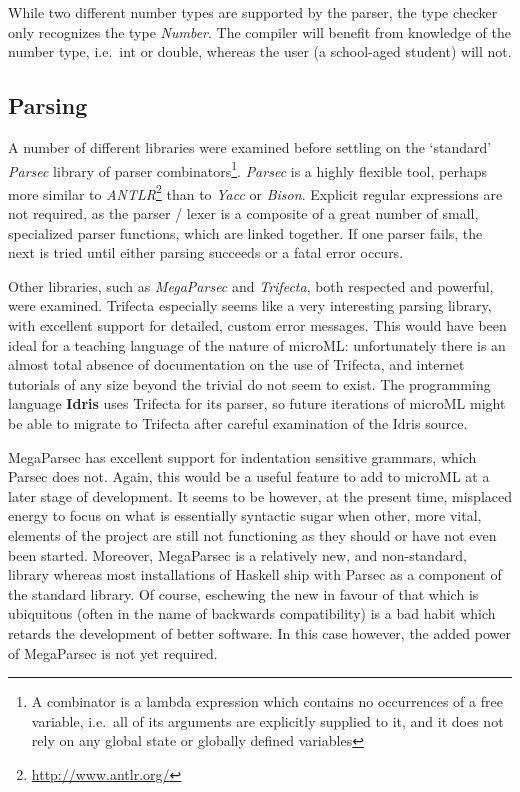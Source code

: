 \documentclass[12pt, a4paper]{report}
\begin{document}
While two different number types are supported by the parser, the type checker only recognizes the
type \textit{Number}. The compiler will benefit from knowledge of the number type, i.e.\ int or double,
whereas the user (a school-aged student) will not.

\subsection{Parsing}
A number of different libraries were examined before settling on the `standard'
\textit{Parsec} library of parser combinators\footnote{A combinator is a lambda expression which
    contains no occurrences of a free variable, i.e.\ all of its arguments are
    explicitly supplied to it, and it does not rely on any global state or globally defined
    variables}. \textit{Parsec} is a highly
flexible tool, perhaps more similar to \textit{ANTLR}\footnote{\url{http://www.antlr.org/}} than to
\textit{Yacc} or \textit{Bison}. Explicit regular expressions are not required, as the parser /
lexer is a composite of a great number of small, specialized parser functions, which are linked
together. If one parser fails, the next is tried until either parsing succeeds or a fatal error
occurs. 

Other libraries, such as \textit{MegaParsec} and \textit{Trifecta}, both respected and
powerful, were examined. Trifecta especially seems like a very interesting parsing library,
with excellent support for detailed, custom error messages. This would have been ideal for a
teaching language of the nature of microML: unfortunately there is an almost total absence of
documentation on the use of Trifecta, and internet tutorials of any size beyond the trivial 
do not seem to exist. The programming
language \textbf{Idris} uses Trifecta for its parser, so future iterations of microML might be able
to migrate to Trifecta after careful examination of the Idris source. 

MegaParsec has excellent
support for indentation sensitive grammars, which Parsec does not. Again, this would be a useful
feature to add to microML at a later stage of development. It seems to be however, at the present time, misplaced
energy to focus on what is essentially syntactic sugar when other, more vital, elements of the
project are still not functioning as they should or have not even been started. Moreover, MegaParsec
is a relatively new, and non-standard, library whereas most installations of Haskell ship with
Parsec as a component of the standard library. Of course, eschewing the new in favour of that which
is ubiquitous (often in the name of backwards compatibility) is a bad habit which retards the
development of better software. In this case however, the added power of MegaParsec is not yet
required.
\end{document}
